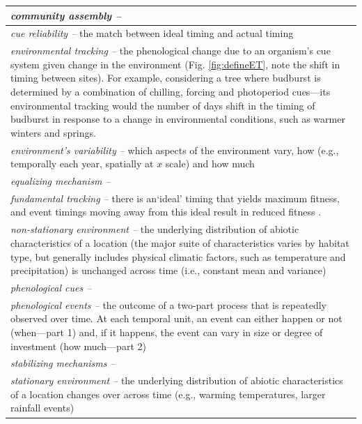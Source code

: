 \documentclass[11pt,letterpaper]{article}
\begin{document}
\clearpage
\begin{center}
\begin{table}
\begin{tabular}{ | p{16 cm} | }
\hline \hline
\emph{community assembly --}  \\ \hline
\emph{cue reliability --} the match between ideal timing and actual timing \citep{donald2013,bonamour2019} \\  \hline
\emph{environmental tracking --}  the phenological change due to an organism's cue system given change in the environment  (Fig. \ref{fig:defineET}, note the shift in timing between sites). For example, considering a tree where budburst is determined by a combination of chilling, forcing and photoperiod cues---its environmental tracking would the number of days shift in the timing of budburst in response to a change in environmental conditions, such as warmer winters and springs. \\  \hline %
\emph{environment's variability --} which aspects of the environment vary, how (e.g., temporally each year, spatially at $x$ scale) and how much \\  \hline
\emph{equalizing mechanism --} \\  \hline
\emph{fundamental tracking --} there is an`ideal' timing that yields maximum fitness, and event timings moving away from this ideal result in reduced fitness \citep[a foundational concept of the trophic mismatch literature,][]{vissergienapp2019}.\\  \hline
\emph{non-stationary environment --} the underlying distribution of abiotic characteristics of a location (the major suite of characteristics varies by habitat type, but generally includes physical climatic factors, such as temperature and precipitation) is unchanged across time (i.e., constant mean and variance) \\  \hline
\emph{phenological cues --} \\  \hline
\emph{phenological events --} the outcome of a two-part process that is repeatedly observed over time. At each temporal unit, an event can either happen or not (when---part 1) and, if it happens, the event can vary in size or degree of investment (how much---part 2) \\  \hline
\emph{stabilizing mechanisms --} \\  \hline
\emph{stationary environment --} the underlying distribution of abiotic characteristics of a location changes over across time (e.g., warming temperatures, larger rainfall events)  \\  \hline

\end{tabular}
\end{table}
\end{center}
\end{document}
